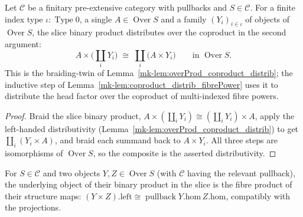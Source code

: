 \begin{lemma}\label{mk-lem:overProd_coproduct_distrib_right}
  \leanok

  Let \(\mathcal{C}\) be a finitary pre-extensive category with pullbacks and \(S \in \mathcal{C}\).
  For a finite index type \(\iota : \operatorname{Type} 0\), a single \(A \in \operatorname{Over} S\)
  and a family \((Y_i)_{i \in \iota}\) of objects of \(\operatorname{Over} S\), the slice binary
  product distributes over the coproduct in the second argument:
  \[
    A \times \bigl(\textstyle\coprod_{i} Y_i\bigr)
      \;\cong\;
    \coprod_{i} \bigl(A \times Y_i\bigr)
      \qquad\text{in } \operatorname{Over} S.
  \]
  This is the braiding-twin of Lemma~\ref{mk-lem:overProd_coproduct_distrib}; the inductive step of
  Lemma~\ref{mk-lem:coproduct_distrib_fibrePower} uses it to distribute the head factor over the
  coproduct of multi-indexed fibre powers.
\end{lemma}
\begin{proof}
  Braid the slice binary product, \(A \times (\coprod_i Y_i) \cong (\coprod_i Y_i) \times A\), apply
  the left-handed distributivity (Lemma~\ref{mk-lem:overProd_coproduct_distrib}) to get
  \(\coprod_i (Y_i \times A)\), and braid each summand back to \(A \times Y_i\). All three steps are
  isomorphisms of \(\operatorname{Over} S\), so the composite is the asserted distributivity.
\end{proof}

\begin{lemma}
  \label{mk-lem:overProdLeftIsoPullback_mathlib}
  \mathlibok

  For \(S \in \mathcal{C}\) and two objects \(Y, Z \in \operatorname{Over} S\) (with \(\mathcal{C}\)
  having the relevant pullback), the underlying object of their binary product in the slice is the
  fibre product of their structure maps: \((Y \times Z).\mathrm{left} \cong \operatorname{pullback}
  Y.\mathrm{hom}\, Z.\mathrm{hom}\), compatibly with the projections.
\end{lemma}


